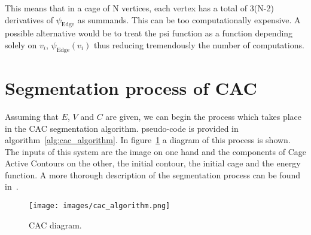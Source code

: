 This means that in a cage of N vertices, each vertex has a total of 3(N-2) derivatives of $\psi_{\mathrm{Edge}}$ as summands. This can be too computationally expensive.  A possible alternative would be to treat the psi function as a function depending solely on $v_i$, $\psi_{\mathrm{Edge}}(v_i)$ thus reducing tremendously the number of computations.


\section{Segmentation process of CAC}
\label{subsec:evolution}

Assuming that $E$, $V$ and $C$ are given, we can begin the process which takes place in the CAC segmentation algorithm.  pseudo-code is provided in algorithm~\ref{alg:cac_algorithm}.  In figure~\ref{fig:cac_algorithm} a diagram of this process is shown. The inputs of this system are the image on one hand and the components of Cage Active Contours on the other, the initial contour, the initial cage and the energy function.
A more thorough description of the segmentation process can be found in~\cite{ipcac2015}.



\begin{figure}[h!]
	\centering
	{\texttt{[image: images/cac\_algorithm.png]}}
	\caption{CAC diagram.}
	\label{fig:cac_algorithm}
\end{figure}


